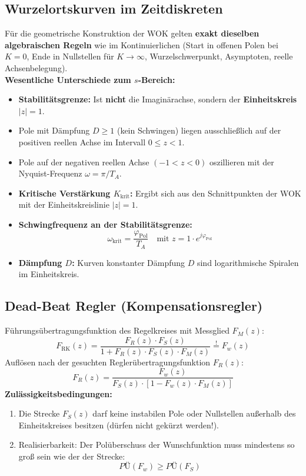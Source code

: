 \subsection{Wurzelortskurven im Zeitdiskreten}
\begin{tcolorbox}
Für die geometrische Konstruktion der WOK gelten \textbf{exakt dieselben algebraischen Regeln} wie im Kontinuierlichen (Start in offenen Polen bei $K=0$, Ende in Nullstellen für $K \to \infty$, Wurzelschwerpunkt, Asymptoten, reelle Achsenbelegung).\\[3pt]
\textbf{Wesentliche Unterschiede zum $s$-Bereich:}
\begin{itemize}
  \item \textbf{Stabilitätsgrenze:} Ist \textbf{nicht} die Imaginärachse, sondern der \textbf{Einheitskreis $|z| = 1$}.
  \item Pole mit Dämpfung $D \ge 1$ (kein Schwingen) liegen ausschließlich auf der positiven reellen Achse im Intervall $0 \le z < 1$.
  \item Pole auf der negativen reellen Achse $(-1 < z < 0)$ oszillieren mit der Nyquist-Frequenz $\omega = \pi / T_A$.
  \item \textbf{Kritische Verstärkung $K_{\text{krit}}$:} Ergibt sich aus den Schnittpunkten der WOK mit der Einheitskreislinie $|z| = 1$.
  \item \textbf{Schwingfrequenz an der Stabilitätsgrenze:}
  \[
  \omega_{\text{krit}} = \frac{\varphi_{\text{Pol}}}{T_A} \quad \text{mit } z = 1 \cdot e^{j \varphi_{\text{Pol}}}
  \]
  \item \textbf{Dämpfung $D$:} Kurven konstanter Dämpfung $D$ sind logarithmische Spiralen im Einheitskreis.
\end{itemize}
\end{tcolorbox}

\subsection{Dead-Beat Regler (Kompensationsregler)}

\begin{tcolorbox}
Führungsübertragungsfunktion des Regelkreises mit Messglied $F_M(z)$:
\[
F_{\text{RK}}(z) = \frac{F_R(z) \cdot F_S(z)}{1 + F_R(z) \cdot F_S(z) \cdot F_M(z)} \stackrel{!}{=} F_w(z)
\]
Auflösen nach der gesuchten Reglerübertragungsfunktion $F_R(z)$:
\[
F_R(z) = \frac{F_w(z)}{F_S(z) \cdot [1 - F_w(z) \cdot F_M(z)]}
\]
\textbf{Zulässigkeitsbedingungen:}
\begin{enumerate}
  \item Die Strecke $F_S(z)$ darf keine instabilen Pole oder Nullstellen außerhalb des Einheitskreises besitzen (dürfen nicht gekürzt werden!).
  \item Realisierbarkeit: Der Polüberschuss der Wunschfunktion muss mindestens so groß sein wie der der Strecke:
  \[
  PÜ(F_w) \ge PÜ(F_S)
  \]
\end{enumerate}
\end{tcolorbox}

